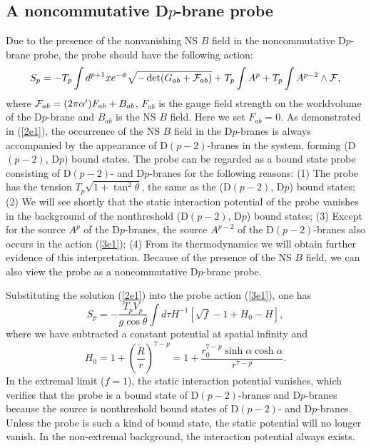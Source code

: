 \documentclass[a4paper,12pt]{article}
\begin{document}
\subsection{A noncommutative D$p$-brane probe}

Due to the presence of the nonvanishing NS $B$ field in the noncommutative
D$p$-brane probe, the probe should have the following action:
\begin{equation}
\label{3e1}
S_p= -T_p\int d^{p+1}x e^{-\phi}\sqrt{-\det(G_{ab} +{\cal F}_{ab})}
  +T_p\int A^{p} +T_p \int A^{p-2}\wedge {\cal F},
\end{equation}
where ${\cal F}_{ab} = (2\pi \alpha')F_{ab} +B_{ab}$, $F_{ab}$ is
the gauge field strength on the worldvolume of the D$p$-brane and $B_{ab}$
is the NS $B$ field. Here we set $F_{ab}=0$. As demonstrated in (\ref{2e1}),
the occurrence of the NS $B$ field in the D$p$-branes is always accompanied
by the appearance of D$(p-2)$-branes in the system, forming (D$(p-2)$, D$p$)
bound states. The probe can be regarded as a bound state probe consisting
of D$(p-2)$- and D$p$-branes for the following reasons:
(1) The probe has the tension $T_p\sqrt{1+\tan^2\theta}$, the same as the
(D$(p-2)$, D$p$) bound states;
(2) We will see shortly that the static interaction potential of the probe
vanishes in the background of the nonthreshold (D$(p-2)$, D$p$) bound states;
(3) Except for the source $A^{p}$ of the D$p$-branes, the source $A^{p-2}$ of
the D$(p-2)$-branes also occurs in the action (\ref{3e1});
(4) From its thermodynamics we will obtain further evidence of this
interpretation. Because of the presence of the NS $B$ field,
we can also view the probe as a noncommutative D$p$-brane probe.

Substituting the solution (\ref{2e1}) into the probe action (\ref{3e1}),
one has
\begin{equation}
\label{3e2}
S_p=-\frac{T_pV_p}{g\cos\theta}\int d\tau H^{-1}[\sqrt{f}-1+H_0-H],
\end{equation}
where we have subtracted a constant potential at spatial infinity and
\begin{equation}
H_0= 1+\left(\frac{\tilde{R}}{r}\right)^{7-p}=1+\frac{r_0^{7-p}
   \sinh\alpha\cosh\alpha}{r^{7-p}}.
\end{equation}
In the extremal limit ($f=1$), the static interaction potential vanishes,
which verifies that the probe is a bound state of D$(p-2)$-branes and
D$p$-branes because the source is nonthreshold bound states of D$(p-2)$-
and D$p$-branes. Unless the probe is such a kind of bound state, the static
potential will no longer vanish. In the non-extremal
background, the interaction potential always exists.
\end{document}
